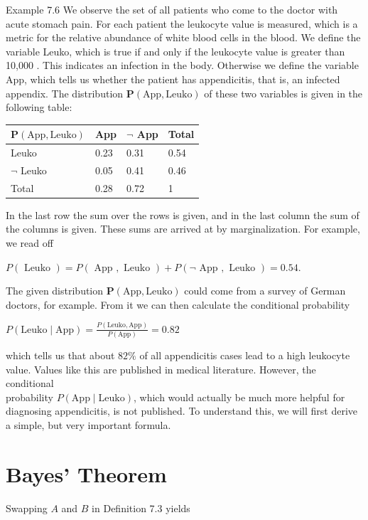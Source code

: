 \documentclass[10pt]{book}
\begin{document}
Example 7.6 We observe the set of all patients who come to the doctor with acute stomach pain. For each patient the leukocyte value is measured, which is a metric for the relative abundance of white blood cells in the blood. We define the variable Leuko, which is true if and only if the leukocyte value is greater than 10,000 . This indicates an infection in the body. Otherwise we define the variable App, which tells us whether the patient has appendicitis, that is, an infected appendix. The distribution $\boldsymbol{P}(\text{App},\text{Leuko})$ of these two variables is given in the following table:

\begin{center}
\begin{tabular}{llll}
\hline
$\boldsymbol{P}(\text{App},\text{Leuko})$ & App & $\neg$ App & Total \\
\hline
Leuko & 0.23 & 0.31 & 0.54 \\
\hline
$\neg$ Leuko & 0.05 & 0.41 & 0.46 \\
\hline
Total & 0.28 & 0.72 & 1 \\
\hline
\end{tabular}
\end{center}

In the last row the sum over the rows is given, and in the last column the sum of the columns is given. These sums are arrived at by marginalization. For example, we read off

$
P(\text { Leuko })=P(\text { App }, \text { Leuko })+P(\neg \text { App }, \text { Leuko })=0.54 .
$

The given distribution $\boldsymbol{P}(\text{App},\text{Leuko})$ could come from a survey of German doctors, for example. From it we can then calculate the conditional probability

$
P(\text{Leuko} \mid \text{App})=\frac{P(\text{Leuko}, \text{App})}{P(\text{App})}=0.82
$

which tells us that about $82 \%$ of all appendicitis cases lead to a high leukocyte value. Values like this are published in medical literature. However, the conditional\\
probability $P(\text{App} \mid \text{Leuko})$, which would actually be much more helpful for diagnosing appendicitis, is not published. To understand this, we will first derive a simple, but very important formula.

\section{Bayes' Theorem}
Swapping $A$ and $B$ in Definition 7.3 yields
\end{document}
